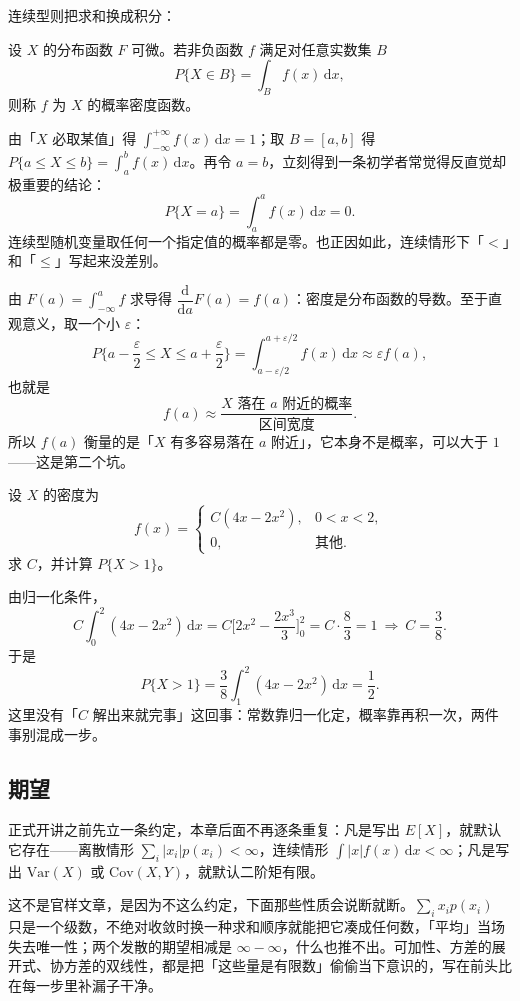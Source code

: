 连续型则把求和换成积分：

\begin{definition}[概率密度]
设 $X$ 的分布函数 $F$ 可微。若非负函数 $f$ 满足对任意实数集 $B$
\[
P\{X\in B\}=\int_B f(x)\,\mathrm{d}x,
\]
则称 $f$ 为 $X$ 的概率密度函数。
\end{definition}

由「$X$ 必取某值」得 $\int_{-\infty}^{+\infty}f(x)\,\mathrm{d}x=1$；取 $B=[a,b]$ 得 $P\{a\le X\le b\}=\int_a^b f(x)\,\mathrm{d}x$。再令 $a=b$，立刻得到一条初学者常觉得反直觉却极重要的结论：
\[
P\{X=a\}=\int_a^a f(x)\,\mathrm{d}x=0 .
\]
连续型随机变量取任何一个指定值的概率都是零。也正因如此，连续情形下「$<$」和「$\le$」写起来没差别。

由 $F(a)=\int_{-\infty}^{a}f$ 求导得 $\dfrac{\mathrm{d}}{\mathrm{d}a}F(a)=f(a)$：密度是分布函数的导数。至于直观意义，取一个小 $\varepsilon$：
\[
P\Big\{a-\frac{\varepsilon}{2}\le X\le a+\frac{\varepsilon}{2}\Big\}
=\int_{a-\varepsilon/2}^{a+\varepsilon/2}f(x)\,\mathrm{d}x\approx \varepsilon f(a),
\]
也就是
\[
f(a)\approx\frac{\text{$X$ 落在 $a$ 附近的概率}}{\text{区间宽度}} .
\]
所以 $f(a)$ 衡量的是「$X$ 有多容易落在 $a$ 附近」，它本身不是概率，可以大于 $1$——这是第二个坑。

\begin{example}
设 $X$ 的密度为
\[
f(x)=\begin{cases}C(4x-2x^2), & 0<x<2,\\ 0, & \text{其他}.\end{cases}
\]
求 $C$，并计算 $P\{X>1\}$。
\end{example}

由归一化条件，
\[
C\int_0^2(4x-2x^2)\,\mathrm{d}x
=C\Big[2x^2-\frac{2x^3}{3}\Big]_0^2
=C\cdot\frac{8}{3}=1
\ \Longrightarrow\ C=\frac38 .
\]
于是
\[
P\{X>1\}=\frac38\int_1^2(4x-2x^2)\,\mathrm{d}x=\frac12 .
\]
这里没有「$C$ 解出来就完事」这回事：常数靠归一化定，概率靠再积一次，两件事别混成一步。

\subsection{期望}

正式开讲之前先立一条约定，本章后面不再逐条重复：凡是写出 $E[X]$，就默认它存在——离散情形 $\sum_i|x_i|p(x_i)<\infty$，连续情形 $\int|x|f(x)\,\mathrm{d}x<\infty$；凡是写出 $\mathrm{Var}(X)$ 或 $\mathrm{Cov}(X,Y)$，就默认二阶矩有限。

这不是官样文章，是因为不这么约定，下面那些性质会说断就断。$\sum_i x_ip(x_i)$ 只是一个级数，不绝对收敛时换一种求和顺序就能把它凑成任何数，「平均」当场失去唯一性；两个发散的期望相减是 $\infty-\infty$，什么也推不出。可加性、方差的展开式、协方差的双线性，都是把「这些量是有限数」偷偷当下意识的，写在前头比在每一步里补漏子干净。

